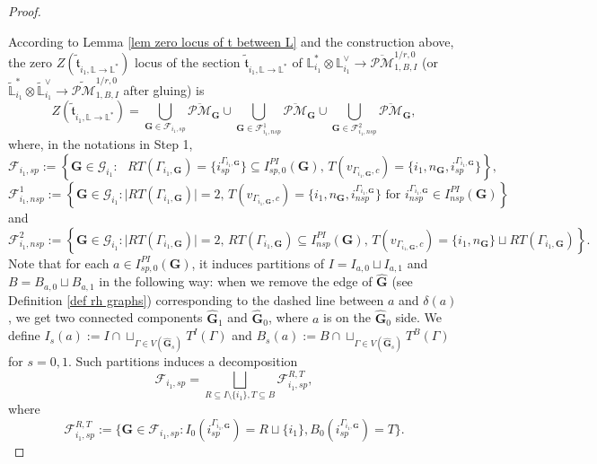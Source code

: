 \documentclass[11pt]{amsart}
\theoremstyle{definition}
\theoremstyle{remark}
\newcommand{\oPMb}{{\overline{\mathcal{PM}}}}
\newcommand{\<}{\left<}
\renewcommand{\>}{\right>}
\numberwithin{equation}{section}
\begin{document}
\begin{proof}
\begin{itemize}
        \end{itemize}

        According to Lemma \ref{lem zero locus of t between L} and the construction above, the zero $Z(\tilde{\mathfrak{t}}_{i_1,\mathbb L \to \mathbb L^*})$ locus of the section $\tilde{\mathfrak{t}}_{i_1,\mathbb L \to \mathbb L^*}$ of  ${\mathbb L}^*_{i_1}\otimes {\mathbb L}_{i_1}^\vee\to  \oPMb^{1/r,0}_{1,B,I}$ (or $\widetilde{\mathbb L}^*_{i_1}\otimes \widetilde{\mathbb L}_{i_1}^\vee \to \widetilde{\mathcal{PM}}^{1/r,0}_{1,B,I}$ after gluing) is 
        \begin{equation*}
        Z(\tilde{\mathfrak{t}}_{i_1,\mathbb L \to \mathbb L^*})=\bigcup_{\mathbf{G}\in \bm{\mathcal F}_{i_1,sp}} \oPMb_{\mathbf{G}} \cup \bigcup_{\mathbf{G}\in \bm{\mathcal F}^1_{i_1,nsp}} \oPMb_{\mathbf{G}} \cup \bigcup_{\mathbf{G}\in\bm{\mathcal F}^2_{i_1,nsp}} \oPMb_{\mathbf{G}},
        \end{equation*}
        where, in the notations in Step 1, 
        \begin{equation*}
            \bm{\mathcal F}_{i_1,sp}:=\left\{ \bm{G}\in \bm{\mathcal G}_{i_1} \colon \text{ $RT(\Gamma_{i_1,\bm{G}})=\{i^{\Gamma_{i_1,\bm{G}}}_{sp}\}\subseteq I^{PI}_{sp,0}(\bm{G})$, $T(v_{\Gamma_{i_1,\bm{G}},c})=\{i_1,n_{\bm{G}},i^{\Gamma_{i_1,\bm{G}}}_{sp}\}$}\right \},
        \end{equation*}
         \begin{equation*}
            \bm{\mathcal F}^1_{i_1,nsp}:=\left\{ \bm{G}\in \bm{\mathcal G}_{i_1} \colon \text{$\lvert RT(\Gamma_{i_1,\bm{G}})\rvert=2$, $T(v_{\Gamma_{i_1,\bm{G}},c})=\{i_1,n_{\bm{G}},i^{\Gamma_{i_1,\bm{G}}}_{nsp}\}$ for $i^{\Gamma_{i_1,\bm{G}}}_{nsp}\in I^{PI}_{nsp}(\bm{G})$}\right \}
        \end{equation*}
        and 
        \begin{equation*}
            \bm{\mathcal F}^2_{i_1,nsp}:=\left\{ \bm{G}\in \bm{\mathcal G}_{i_1} \colon \text{$\lvert RT(\Gamma_{i_1,\bm{G}})\rvert=2$, $RT(\Gamma_{i_1,\bm{G}})\subseteq I^{PI}_{nsp}(\bm{G})$,  $T(v_{\Gamma_{i_1,\bm{G}},c})=\{i_1,n_{\bm{G}}\}\sqcup RT(\Gamma_{i_1,\bm{G}}) $}\right \}.
        \end{equation*}
        Note that for each $a\in I^{PI}_{sp,0}({\bm{G}})$, it induces  partitions of $I=I_{a,0}\sqcup I_{a,1}$ and $B=B_{a,0}\sqcup B_{a,1}$ in the following way:  when we remove the edge of $\hat{\bm{G}}$ (see Definition \ref{def rh graphs}) corresponding to the dashed line between $a$ and $\delta(a)$, we get two connected components $\hat{\bm{G}}_1$ and $\hat{\bm{G}}_0$, where $a$ is on the $\hat{\bm{G}}_0$ side. We define 
        $I_{s}(a):=I\cap \sqcup_{\Gamma\in V(\hat{\bm{G}}_s)} T^I(\Gamma)$ and $B_{s}(a):=B\cap \sqcup_{\Gamma\in V(\hat{\bm{G}}_s)} T^B(\Gamma)$ for $s=0,1$. Such partitions induces a decomposition 
        $$
        \bm{\mathcal F}_{i_1,sp}=\bigsqcup_{R\subseteq I\setminus\{i_1\}, T\subseteq B} \bm{\mathcal F}_{i_1,sp}^{R,T},
        $$
        where
        $$
       \bm{\mathcal F}_{i_1,sp}^{R,T}:=\{\bm{G} \in  \bm{\mathcal F}_{i_1,sp}\colon I_{0}(i_{sp}^{\Gamma_{i_1,\bm{G}}})=R\sqcup \{i_1\}, B_{0}(i_{sp}^{\Gamma_{i_1,\bm{G}}})=T \}.
        $$


\end{proof}
\end{document}
